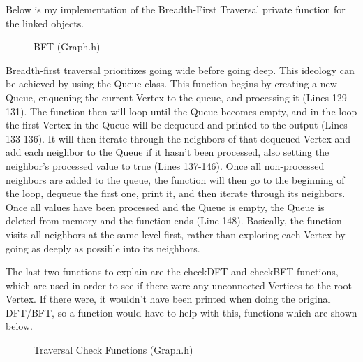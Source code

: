\documentclass[letterpaper, 10pt]{article}
\begin{document}
\vspace{1em}
\noindent
Below is my implementation of the Breadth-First Traversal private function for the linked objects.
\begin{figure}[H]
  \centering
   
  \caption{BFT (Graph.h)}
  \label{fig:figure2.20}
\end{figure}

\noindent
Breadth-first traversal prioritizes going wide before going deep. This ideology can be achieved by using the Queue class. This function begins by creating a new Queue, enqueuing the current Vertex to the queue, and processing it (Lines 129-131). The function then will loop until the Queue becomes empty, and in the loop the first Vertex in the Queue will be dequeued and printed to the output (Lines 133-136). It will then iterate through the neighbors of that dequeued Vertex and add each neighbor to the Queue if it hasn't been processed, also setting the neighbor's processed value to true (Lines 137-146). Once all non-processed neighbors are added to the queue, the function will then go to the beginning of the loop, dequeue the first one, print it, and then iterate through its neighbors. Once all values have been processed and the Queue is empty, the Queue is deleted from memory and the function ends (Line 148). Basically, the function visits all neighbors at the same level first, rather than exploring each Vertex by going as deeply as possible into its neighbors.

\vspace{1em}
\noindent
The last two functions to explain are the checkDFT and checkBFT functions, which are used in order to see if there were any unconnected Vertices to the root Vertex. If there were, it wouldn't have been printed when doing the original DFT/BFT, so a function would have to help with this, functions which are shown below.

\begin{figure}[H]
  \centering
   
  \label{fig:figure2.21-part1}
\end{figure}

\vspace{-3em}

\begin{figure}[H]
  \centering
   
  \caption{Traversal Check Functions (Graph.h)}
  \label{fig:figure2.21-part2}
\end{figure}
\end{document}
